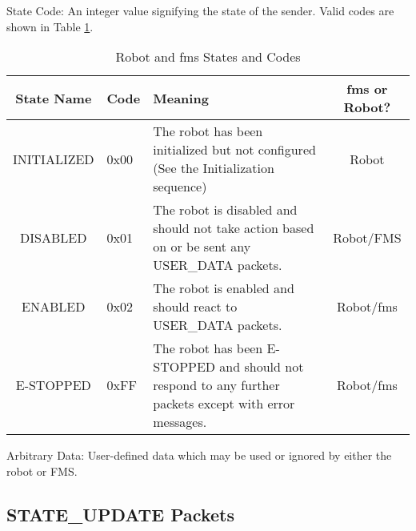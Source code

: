 \documentclass[11pt]{article}
\begin{document}
State Code: An integer value signifying the state of the sender.  Valid codes are shown in Table \ref{tab:StateCodes}.

\begin{table}[h!]
    \centering
    \label{tab:StateCodes}
    \caption{Robot and \acrshort{fms} States and Codes}
    \begin{tabular}{|c|p{1cm}|p{3in}|c|}
        \hline
        State Name & Code & Meaning & \acrshort{fms} or Robot? \\
        \hline
        INITIALIZED & 0x00 & The robot has been initialized but not configured (See the Initialization sequence) & Robot \\
        \hline
        DISABLED & 0x01 & The robot is disabled and should not take action based on or be sent any USER\_DATA packets. & Robot/FMS\\
        \hline
        ENABLED & 0x02 & The robot is enabled and should react to USER\_DATA packets. & Robot/\acrshort{fms} \\
        \hline
        E-STOPPED & 0xFF & The robot has been E-STOPPED and should not respond to any further packets except with error messages. & Robot/\acrshort{fms} \\
        \hline
    \end{tabular}
\end{table}

Arbitrary Data: User-defined data which may be used or ignored by either the robot or FMS.

\subsection {STATE\_UPDATE Packets}
\end{document}
